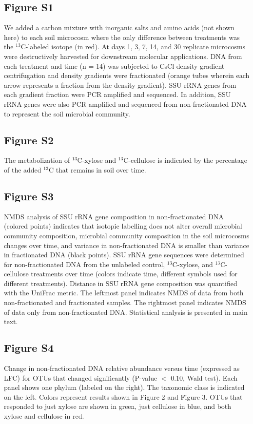 \subsection{Figure S1}
We added a carbon mixture with inorganic
salts and amino acids (not shown here) to each soil microcosm where the
only difference between treatments was the $^{13}$C-labeled isotope (in red). At days
1, 3, 7, 14, and 30 replicate microcosms were destructively harvested for
downstream molecular applications. DNA from each treatment and time (n = 14)
was subjected to CsCl density gradient centrifugation and density gradients
were fractionated (orange tubes wherein each arrow represents a fraction from
the density gradient). SSU rRNA genes from each gradient fraction were PCR
amplified and sequenced. In addition, SSU rRNA genes were also PCR amplified
and sequenced from non-fractionated DNA to represent the soil microbial
community.

\subsection{Figure S2}
The metabolization of $^{13}$C-xylose and $^{13}$C-cellulose is indicated by
the percentage of the added $^{13}$C that remains in soil over time.
\subsection{Figure S3}
NMDS analysis of SSU rRNA gene composition in non-fractionated DNA (colored points) indicates
that isotopic labelling does not alter overall microbial community composition,
microbial community composition in the soil microcosms changes over time, and
variance in non-fractionated DNA is smaller than variance in fractionated DNA (black points).
SSU rRNA gene sequences were determined for non-fractionated DNA from the
unlabeled control, $^{13}$C-xylose, and $^{13}$C-cellulose treatments over time (colors
indicate time, different symbols used for different treatments). Distance in SSU
rRNA gene composition was quantified with the UniFrac metric. The
leftmost panel indicates NMDS of data from both non-fractionated and
fractionated samples. The rightmost panel indicates NMDS of data only from
non-fractionated DNA. Statistical analysis is presented in main text.
\subsection{Figure S4}
Change in non-fractionated DNA relative abundance versus time (expressed
as LFC) for OTUs that changed significantly (P-value $<$ 0.10, Wald test).
Each panel shows one phylum (labeled on the right). The taxonomic class is
indicated on the left. Colors represent results shown in Figure 2 and
Figure 3.  OTUs that responded to just xylose are shown in 
green, just cellulose in blue, and both xylose and cellulose in red.  

